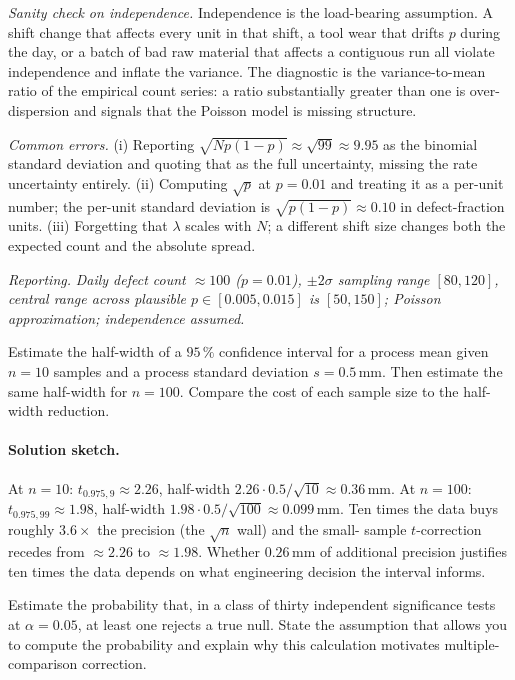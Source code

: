 \textit{Sanity check on independence.} Independence is the
load-bearing assumption. A shift change that affects every unit in
that shift, a tool wear that drifts $p$ during the day, or a batch
of bad raw material that affects a contiguous run all violate
independence and inflate the variance. The diagnostic is the
variance-to-mean ratio of the empirical count series: a ratio
substantially greater than one is over-dispersion and signals that
the Poisson model is missing structure.

\textit{Common errors.} (i) Reporting $\sqrt{Np(1-p)}
\approx \sqrt{99} \approx 9.95$ as the binomial standard deviation
and quoting that as the full uncertainty, missing the rate
uncertainty entirely. (ii) Computing $\sqrt{p}$ at $p = 0.01$ and
treating it as a per-unit number; the per-unit standard deviation
is $\sqrt{p(1-p)} \approx 0.10$ in defect-fraction units.
(iii) Forgetting that $\lambda$ scales with $N$; a different shift
size changes both the expected count and the absolute spread.

\textit{Reporting.} \emph{Daily defect count $\approx 100$
($p = 0.01$), $\pm 2\sigma$ sampling range $[80, 120]$, central
range across plausible $p \in [0.005, 0.015]$ is $[50, 150]$;
Poisson approximation; independence assumed.}

\begin{exercise}
Estimate the half-width of a $95 \,\%$ confidence interval for a
process mean given $n = 10$ samples and a process standard
deviation $s = 0.5 \,\si{\milli\meter}$. Then estimate the same
half-width for $n = 100$. Compare the cost of each sample size to
the half-width reduction.
\end{exercise}

\paragraph{Solution sketch.}
At $n = 10$: $t_{0.975, 9} \approx 2.26$, half-width $2.26 \cdot
0.5/\sqrt{10} \approx 0.36 \,\si{\milli\meter}$. At $n = 100$:
$t_{0.975, 99} \approx 1.98$, half-width $1.98 \cdot 0.5/\sqrt{100}
\approx 0.099 \,\si{\milli\meter}$. Ten times the data buys roughly
$3.6 \times$ the precision (the $\sqrt{n}$ wall) and the small-
sample $t$-correction recedes from $\approx 2.26$ to $\approx 1.98$.
Whether $0.26 \,\si{\milli\meter}$ of additional precision justifies
ten times the data depends on what engineering decision the
interval informs.

\begin{exercise}
Estimate the probability that, in a class of thirty independent
significance tests at $\alpha = 0.05$, at least one rejects a true
null. State the assumption that allows you to compute the
probability and explain why this calculation motivates multiple-
comparison correction.
\end{exercise}

